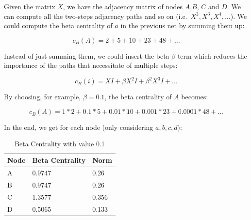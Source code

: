 \documentclass[
  notitlepage,
  onecolumn,
  openany]{book}
\begin{document}
Given the matrix \(X\), we have the adjacency matrix of nodes \(A\),\(B\), \(C\) and \(D\). We can compute all the two-steps adjacency paths and so on (i.e.~\(X^2, X^3, X^4,\dots\)). We could compute the beta centrality of \(a\) in the previous net by summing them up:

\[
c_B(A) = 2+5+10+23+48+\dots
\]

Instead of just summing them, we could insert the beta \(\beta\) term which reduces the importance of the paths that necessitate of multiple steps:

\[
c_B(i) = XI+\beta X^2I+\beta^2X^3I+\dots
\]

By choosing, for example, \(\beta = 0.1\), the beta centrality of \(A\) becomes:

\[
c_B(A) = 1*2+0.1*5+0.01*10+0.001*23+0.0001*48+\dots
\]

In the end, we get for each node (only considering \(a,b,c,d\)):

\begin{table}[h]
\centering
\begin{tabular}{@{}lll@{}}
\toprule
\textbf{Node} & \textbf{Beta Centrality} & \textbf{Norm} \\ \midrule
A             & 0.9747                   & 0.26          \\
B             & 0.9747                   & 0.26          \\
C             & 1.3577                   & 0.356         \\
D             & 0.5065                   & 0.133         \\ \bottomrule
\end{tabular}
\caption{Beta Centrality with \beta value 0.1}
\label{tab:my-table}
\end{table}
\end{document}
